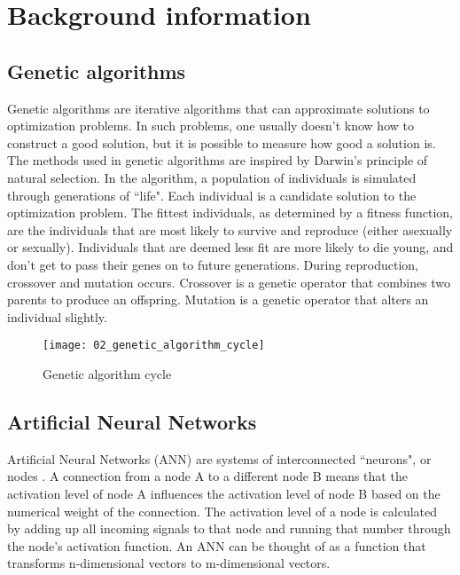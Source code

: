 \chapter{Background information}

\section{Genetic algorithms}
Genetic algorithms \citep{goldberg1989, back1996} are iterative algorithms that can approximate solutions to optimization problems. In such problems, one usually doesn’t know how to construct a good solution, but it is possible to measure how good a solution is. The methods used in genetic algorithms are inspired by Darwin's principle of natural selection. In the algorithm, a population of individuals is simulated through generations of ``life". Each individual is a candidate solution to the optimization problem. The fittest individuals, as determined by a fitness function, are the individuals that are most likely to survive and reproduce (either asexually or sexually). Individuals that are deemed less fit are more likely to die young, and don't get to pass their genes on to future generations. During reproduction, crossover and mutation occurs. Crossover is a genetic operator that combines two parents to produce an offspring. Mutation is a genetic operator that alters an individual slightly.

\begin{figure}[h]
    \centering
    \texttt{[image: 02\_genetic\_algorithm\_cycle]}
    \caption{Genetic algorithm cycle}
    \label{fig:genetic_algorithm_cycle}
\end{figure}

\section{Artificial Neural Networks}
Artificial Neural Networks (ANN) are systems of interconnected ``neurons", or nodes \citep{caudill1987}. A connection from a node A to a different node B means that the activation level of node A influences the activation level of node B based on the numerical weight of the connection. The activation level of a node is calculated by adding up all incoming signals to that node and running that number through the node's activation function. An ANN can be thought of as a function that transforms n-dimensional vectors to m-dimensional vectors.

